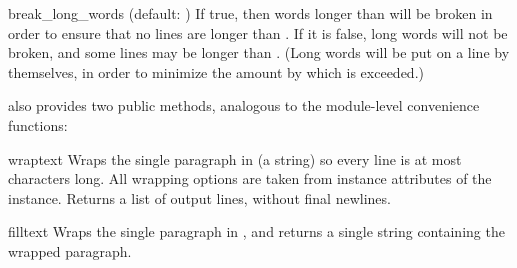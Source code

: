 \begin{memberdesc}{break_long_words}
(default: ) If true, then words longer than
 will be broken in order to ensure that no lines are longer
than .  If it is false, long words will not be broken, and
some lines may be longer than
.  (Long words will be put on a line by themselves, in order
to minimize the amount by which  is exceeded.)
\end{memberdesc}

 also provides two public methods, analogous to the
module-level convenience functions:

\begin{methoddesc}{wrap}{text}
Wraps the single paragraph in  (a string) so every line is at
most  characters long.  All wrapping options are taken from
instance attributes of the  instance.  Returns a list
of output lines, without final newlines.
\end{methoddesc}

\begin{methoddesc}{fill}{text}
Wraps the single paragraph in , and returns a single string
containing the wrapped paragraph.
\end{methoddesc}
